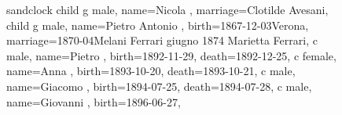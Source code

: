 \documentclass{article}
\begin{document}
\begin{figure}
\begin{minipage}[b]{0.14\textwidth}
    \begin{genealogypicture}[
        processing=database,
        database format=full,
        node size=3.5cm,
        level size=2.8cm,
        level distance=6mm,
        list separators hang=3mm,
        name font=\bfseries,
        surn code={\textcolor{black!50!black}{#1}},
        place text={\newline}{},
        date format=d month yyyy,
        tcbset={male/.style={colframe=blue,colback=blue!5},
        female/.style={colframe=red,colback=red!5}},
        box={fit basedim=7pt,boxsep=2pt,segmentation style=solid,
            halign=left,before upper=\parskip1pt,
            \gtrDBsex,
        },
    ]
    sandclock
    {
        child{
            g{
                male,
                name={Nicola },
                marriage={Clotilde Avesani}{},
            }
            child{
                g{
                    male,
                    name={Pietro Antonio },
                    birth={1867-12-03}{Verona},
                    marriage={1870-04}{Melani Ferrari  giugno 1874 \newline Marietta Ferrari},
                }
                c{
                    male,
                    name={Pietro },
                    birth={1892-11-29}{},
                    death={1892-12-25}{},
                }
                c{
                    female,
                    name={Anna },
                    birth={1893-10-20}{},
                    death={1893-10-21}{},
                }
                c{
                    male,
                    name={Giacomo },
                    birth={1894-07-25}{},
                    death={1894-07-28}{},
                }
                c{
                    male,
                    name={Giovanni },
                    birth={1896-06-27}{},
                }
            }
        }
    }
    \end{genealogypicture}

\end{minipage}
\label{fig:figure3}
\end{figure}
\end{document}
